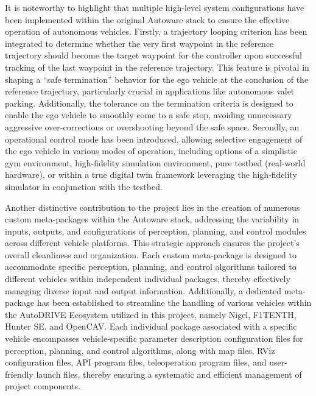 It is noteworthy to highlight that multiple high-level system configurations have been implemented within the original Autoware stack to ensure the effective operation of autonomous vehicles. Firstly, a trajectory looping criterion has been integrated to determine whether the very first waypoint in the reference trajectory should become the target waypoint for the controller upon successful tracking of the last waypoint in the reference trajectory. This feature is pivotal in shaping a ``safe termination'' behavior for the ego vehicle at the conclusion of the reference trajectory, particularly crucial in applications like autonomous valet parking. Additionally, the tolerance on the termination criteria is designed to enable the ego vehicle to smoothly come to a safe stop, avoiding unnecessary aggressive over-corrections or overshooting beyond the safe space. Secondly, an operational control mode has been introduced, allowing selective engagement of the ego vehicle in various modes of operation, including options of a simplistic gym environment, high-fidelity simulation environment, pure testbed (real-world hardware), or within a true digital twin framework leveraging the high-fidelity simulator in conjunction with the testbed.

Another distinctive contribution to the project lies in the creation of numerous custom meta-packages within the Autoware stack, addressing the variability in inputs, outputs, and configurations of perception, planning, and control modules across different vehicle platforms. This strategic approach ensures the project's overall cleanliness and organization. Each custom meta-package is designed to accommodate specific perception, planning, and control algorithms tailored to different vehicles within independent individual packages, thereby effectively managing diverse input and output information. Additionally, a dedicated meta-package has been established to streamline the handling of various vehicles within the AutoDRIVE Ecosystem utilized in this project, namely Nigel, F1TENTH, Hunter SE, and OpenCAV. Each individual package associated with a specific vehicle encompasses vehicle-specific parameter description configuration files for perception, planning, and control algorithms, along with map files, RViz configuration files, API program files, teleoperation program files, and user-friendly launch files, thereby ensuring a systematic and efficient management of project components.

